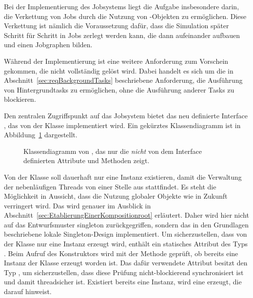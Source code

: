 Bei der Implementierung des Jobsystems liegt die Aufgabe insbesondere darin, die Verkettung von Jobs durch die Nutzung von \classCompletableFuture{}-Objekten zu ermöglichen. Diese Verkettung ist nämlich die Voraussetzung dafür, dass die Simulation später Schritt für Schritt in Jobs zerlegt werden kann, die dann aufeinander aufbauen und einen Jobgraphen bilden. 

Während der Implementierung ist eine weitere Anforderung zum Vorschein gekommen, die nicht vollständig gelöst wird. Dabei handelt es sich um die in Abschnitt~\vref{sec:reqBackgroundTasks} beschriebene Anforderung, die Ausführung von Hintergrundtasks zu ermöglichen, ohne die Ausführung anderer Tasks zu blockieren. 

Den zentralen Zugriffspunkt auf das Jobsystem bietet das neu definierte Interface \classBlocklibExecutorService{}, das von der Klasse \classBlocklibExecutor{} implementiert wird. Ein gekürztes Klassendiagramm ist in Abbildung~\ref{fig:diag-BlocklibExecutor} dargestellt.

\begin{figure}[!htb]
	\centering
	
	\caption[Gekürztes Klassendiagramm von \classBlocklibExecutor{}.]{Klassendiagramm von \classBlocklibExecutor{}, das nur die \emph{nicht} von dem Interface \classBlocklibExecutorService{} definierten Attribute und Methoden zeigt.}\label{fig:diag-BlocklibExecutor}
\end{figure}

Von der Klasse \classBlocklibExecutor{} soll dauerhaft nur eine Instanz existieren, damit die Verwaltung der nebenläufigen Threads von einer Stelle aus stattfindet. Es steht die Möglichkeit in Aussicht, dass die Nutzung globaler Objekte wie \classContext{} in Zukunft verringert wird. Das wird genauer im Ausblick in Abschnitt~\vref{sec:EtablierungEinerKompositionroot} erläutert. Daher wird hier nicht auf das Entwurfsmuster \gls{singleton} zurückgegriffen, sondern das in den Grundlagen beschriebene lokale Singleton-Design implementiert. Um sicherzustellen, dass von der Klasse nur eine Instanz erzeugt wird, enthält \classBlocklibExecutor{} ein statisches Attribut  des Typs \classAtomicBoolean{}. Beim Aufruf des Konstruktors wird mit der Methode  geprüft, ob bereits eine Instanz der Klasse erzeugt worden ist. Das dafür verwendete Attribut  besitzt den Typ , um sicherzustellen, dass diese Prüfung nicht-blockierend synchronisiert ist und damit threadsicher ist. Existiert bereits eine Instanz, wird eine \classUnsupportedOperationException{} erzeugt, die darauf hinweist.

